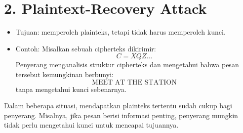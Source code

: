\documentclass{article}
\begin{document}

\section*{2. Plaintext-Recovery Attack}

\begin{itemize}
    \item Tujuan: memperoleh plainteks, tetapi tidak harus memperoleh kunci.
    \item Contoh: Misalkan sebuah cipherteks dikirimir:
    \[ C = XQZ\dots \]
    Penyerang menganalisis struktur cipherteks dan mengetahui bahwa pesan tersebut kemungkinan berbunyi:
    \[ \text{MEET AT THE STATION} \]
    tanpa mengetahui kunci sebenarnya.
\end{itemize}

Dalam beberapa situasi, mendapatkan plainteks tertentu sudah cukup bagi penyerang. Misalnya, jika pesan berisi informasi penting, penyerang mungkin tidak perlu mengetahui kunci untuk mencapai tujuannya.
\end{document}
